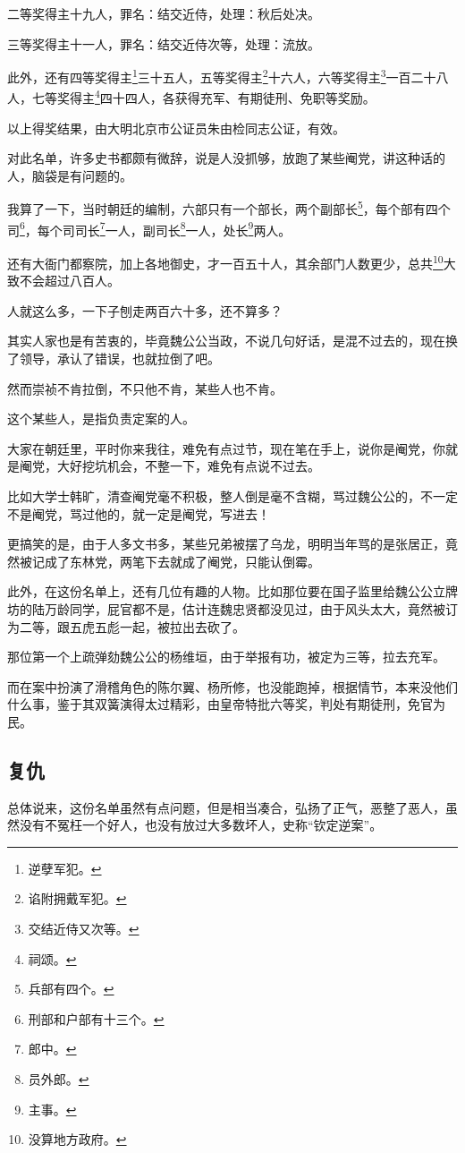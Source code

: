 \begin{multicols}{\theparacolNo}
		二等奖得主十九人，罪名：结交近侍，处理：秋后处决。

		三等奖得主十一人，罪名：结交近侍次等，处理：流放。

		此外，还有四等奖得主\footnote{逆孽军犯。}三十五人，五等奖得主\footnote{谄附拥戴军犯。}十六人，六等奖得主\footnote{交结近侍又次等。}一百二十八人，七等奖得主\footnote{祠颂。}四十四人，各获得充军、有期徒刑、免职等奖励。

		以上得奖结果，由大明北京市公证员朱由检同志公证，有效。

		对此名单，许多史书都颇有微辞，说是人没抓够，放跑了某些阉党，讲这种话的人，脑袋是有问题的。

		我算了一下，当时朝廷的编制，六部只有一个部长，两个副部长\footnote{兵部有四个。}，每个部有四个司\footnote{刑部和户部有十三个。}，每个司司长\footnote{郎中。}一人，副司长\footnote{员外郎。}一人，处长\footnote{主事。}两人。

		还有大衙门都察院，加上各地御史，才一百五十人，其余部门人数更少，总共\footnote{没算地方政府。}大致不会超过八百人。

		人就这么多，一下子刨走两百六十多，还不算多？

		其实人家也是有苦衷的，毕竟魏公公当政，不说几句好话，是混不过去的，现在换了领导，承认了错误，也就拉倒了吧。

		然而崇祯不肯拉倒，不只他不肯，某些人也不肯。

		这个某些人，是指负责定案的人。

		大家在朝廷里，平时你来我往，难免有点过节，现在笔在手上，说你是阉党，你就是阉党，大好挖坑机会，不整一下，难免有点说不过去。

		比如大学士韩旷，清查阉党毫不积极，整人倒是毫不含糊，骂过魏公公的，不一定不是阉党，骂过他的，就一定是阉党，写进去！

		更搞笑的是，由于人多文书多，某些兄弟被摆了乌龙，明明当年骂的是张居正，竟然被记成了东林党，两笔下去就成了阉党，只能认倒霉。

		此外，在这份名单上，还有几位有趣的人物。比如那位要在国子监里给魏公公立牌坊的陆万龄同学，屁官都不是，估计连魏忠贤都没见过，由于风头太大，竟然被订为二等，跟五虎五彪一起，被拉出去砍了。

		那位第一个上疏弹劾魏公公的杨维垣，由于举报有功，被定为三等，拉去充军。

		而在案中扮演了滑稽角色的陈尔翼、杨所修，也没能跑掉，根据情节，本来没他们什么事，鉴于其双簧演得太过精彩，由皇帝特批六等奖，判处有期徒刑，免官为民。

		\subsection{复仇}
		总体说来，这份名单虽然有点问题，但是相当凑合，弘扬了正气，恶整了恶人，虽然没有不冤枉一个好人，也没有放过大多数坏人，史称“钦定逆案”。


\end{multicols}
